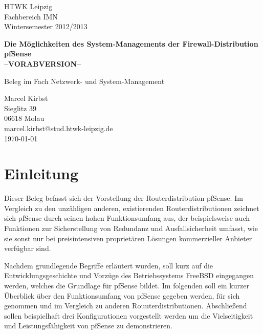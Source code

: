 \documentclass[a4paper,12pt]{scrartcl}
\begin{document}
\begin{titlepage}
\begin{small}
\vfill {HTWK Leipzig\\ 
Fachbereich IMN \\ 
Wintersemester 2012/2013}
\end{small}


\begin{center}
\begin{Large}
\vfill {\textsf{\textbf{
Die Möglichkeiten des System-Managements der Firewall-Distribution
pfSense\\--VORABVERSION--\\
}}}
\end{Large}
Beleg im Fach Netzwerk- und System-Management
\end{center}

\begin{small}
\vfill Marcel Kirbst \\ Sieglitz 39 \\  06618 Molau \\
marcel.kirbst@stud.htwk-leipzig.de\\
\today
\end{small}

\end{titlepage}


\tableofcontents
\thispagestyle{empty}

\clearpage

\onehalfspacing

\pagestyle{plain}


\section{Einleitung}
Dieser Beleg befasst sich der Vorstellung der Routerdistribution pfSense.
Im Vergleich zu den unzähligen anderen, existierenden Routerdistributionen
zeichnet sich pfSense durch seinen hohen Funktionsumfang aus, der beispielsweise
auch Funktionen zur Sicherstellung von Redundanz und Ausfallsicherheit umfasst,
wie sie sonst nur bei preisintensiven proprietären Lösungen kommerzieller
Anbieter verfügbar sind.


Nachdem grundlegende Begriffe erläutert wurden, soll kurz auf die
Entwicklungsgeschichte und Vorzüge des Betriebssystems FreeBSD eingegangen
werden, welches die Grundlage für pfSense bildet. Im folgenden soll ein kurzer
Überblick über den Funktionsumfang von pfSense gegeben werden, für sich genommen
und im Vergleich zu anderen Rouuterdistributionen. Abschließend sollen
beispielhaft drei Konfigurationen vorgestellt werden um die Vielseitigkeit und
Leistungsfähigkeit von pfSense zu demonstrieren.
\end{document}
